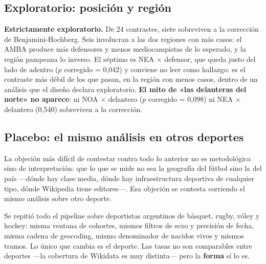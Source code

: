 \documentclass[11pt,a4paper]{article}
\begin{document}
\subsection{Exploratorio: posición y región}

\textbf{Estrictamente exploratorio.} De 24 contrastes, siete sobreviven a la
corrección de Benjamini-Hochberg. Seis involucran a las dos regiones con más
casos: el AMBA produce más defensores y menos mediocampistas de lo esperado, y la
región pampeana lo inverso. El séptimo es NEA $\times$ defensor, que queda justo
del lado de adentro ($p$ corregido = 0,042) y conviene no leer como hallazgo: es
el contraste más débil de los que pasan, en la región con menos casos, dentro de
un análisis que el diseño declara exploratorio. \textbf{El mito de «las delanteras
del norte» no aparece}: ni NOA $\times$ delantero ($p$ corregido = 0,098) ni NEA
$\times$ delantero (0,540) sobreviven a la corrección.

\subsection{Placebo: el mismo análisis en otros deportes}
\label{sec:placebo}

La objeción más difícil de contestar contra todo lo anterior no es metodológica
sino de interpretación: que lo que se mide no sea la geografía del fútbol sino la
del país —dónde hay clase media, dónde hay infraestructura deportiva de cualquier
tipo, dónde Wikipedia tiene editores—. Esa objeción se contesta corriendo el mismo
análisis sobre otro deporte.

Se repitió todo el pipeline sobre deportistas argentinos de básquet, rugby, vóley
y hockey: misma ventana de cohortes, mismos filtros de sexo y precisión de fecha,
misma cadena de geocoding, mismo denominador de nacidos vivos y mismos tramos. Lo
único que cambia es el deporte. Las tasas no son comparables entre deportes —la
cobertura de Wikidata es muy distinta— pero la \textbf{forma} sí lo es.
\end{document}
